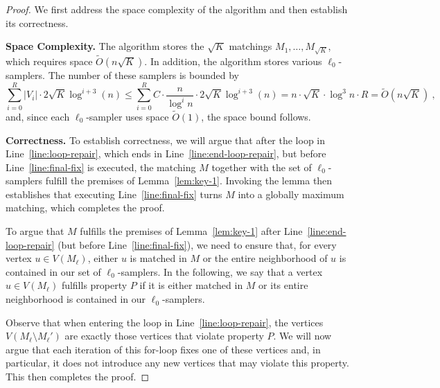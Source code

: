 \documentclass[11pt,a4paper]{article}
\begin{document}
\begin{proof} 
    \noindent We first address the space complexity of the algorithm and then establish its correctness. 

    \vspace{0.15cm}
    \noindent \textbf{Space Complexity.} 
    The algorithm stores the $\sqrt{K}$ matchings $M_1, \dots, M_{\sqrt{K}}$, which requires space $\tilde{O}(n \sqrt{K})$. In addition, the algorithm stores various $\ell_0$-samplers. The number of these samplers is bounded by 
    $$\sum_{i=0}^R |V_i| \cdot 2 \sqrt{K} \log^{i+3}(n) \le  \sum_{i=0}^R C \cdot \frac{n}{\log^i n} \cdot 2 \sqrt{K} \log^{i+3}(n) = n \cdot \sqrt{K} \cdot \log^3 n \cdot R = \tilde{O}(n \sqrt{K}) \ , $$
    and, since each $\ell_0$-sampler uses space $\tilde{O}(1)$, the space bound follows.
    
    \vspace{0.15cm}
    \noindent \textbf{Correctness.}
    To establish correctness, we will argue that after the loop in Line~\ref{line:loop-repair}, which ends in Line~\ref{line:end-loop-repair}, but before Line~\ref{line:final-fix} is executed, the matching $M$ together with the set of $\ell_0$-samplers fulfill the premises of Lemma~\ref{lem:key-1}. Invoking the lemma then establishes that executing Line~\ref{line:final-fix} turns $M$ into a globally maximum matching, which  completes the proof.

    To argue that $M$ fulfills the premises of Lemma~\ref{lem:key-1} after Line~\ref{line:end-loop-repair} (but before Line~\ref{line:final-fix}), we need to ensure that, for every vertex $u \in V(M_\ell)$, either $u$ is matched in $M$ or the entire neighborhood of $u$ is contained in our set of $\ell_0$-samplers. 
    In the following, we say that a vertex $u \in V(M_{\ell})$ fulfills property $P$ if it is either matched in $M$ or its entire neighborhood is contained in our $\ell_0$-samplers.
    
    Observe that when entering the loop in Line~\ref{line:loop-repair}, the vertices $V(M_{\ell} \setminus  M_{\ell}')$ are exactly those vertices that violate property $P$. We will now argue that each iteration of this for-loop fixes one of these vertices and, in particular, it does not introduce any new vertices that may violate this property. This then completes the proof.


\end{proof}
\end{document}
